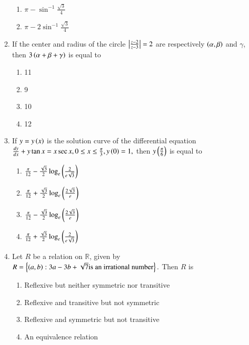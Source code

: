 \documentclass[journal]{IEEEtran}
\begin{document}
\begin{enumerate}
\begin{multicols}{2}
\begin{enumerate}
\item $\pi-\sin^{-1}\frac{\sqrt 3}{4}$
\item $\pi-2\sin^{-1}\frac{\sqrt 3}{4}$
\end{enumerate}
\end{multicols}
\item If the center and radius of the circle $\left\vert\frac{z-2}{z-3}\right\vert=2$ are respectively $\left(\alpha ,\beta\right)$ and $\gamma$, then $3\left(\alpha +\beta +\gamma\right)$ is equal to 
\begin{multicols}{2}
\begin{enumerate}
\item 11
\item 9
\item 10
\item 12
\end{enumerate}
\end{multicols}
\item If $y=y\left(x\right)$ is the solution curve of the differential equation $\frac{dy}{dx}+y\tan{x}=x\sec{x}, 0\le x\le \frac{\pi}{3},y\left(0\right)=1,$ then $y\left(\frac{\pi}{6}\right)$  is equal to
\begin{enumerate}
\item $\frac{\pi}{12}-\frac{\sqrt 3}{2}\log_e\left(\frac{2}{e\sqrt 3}\right)$
\item $\frac{\pi}{12}+\frac{\sqrt 3}{2}\log_e\left(\frac{2\sqrt 3}{e}\right)$
\item $\frac{\pi}{12}-\frac{\sqrt 3}{2}\log_e\left(\frac{2\sqrt 3}{e}\right)$
\item $\frac{\pi}{12}+\frac{\sqrt 3}{2}\log_e\left(\frac{2}{e\sqrt 3}\right)$
\end{enumerate}
\item Let $R$ be a relation on $\mathbb{R}$, given by $R=\left\{\left(a,b\right): 3a-3b+\sqrt 7 \text {is an irrational number}\right\}.$ Then $R$ is 
\begin{enumerate}
\item Reflexive but neither symmetric nor transitive 
\item Reflexive and transitive but not symmetric 
\item Reflexive and symmetric but not transitive 
\item An equivalence relation  
\end{enumerate}	
\end{enumerate}
\end{document}
